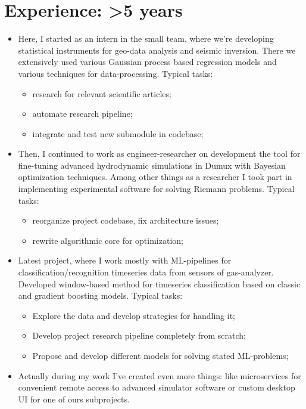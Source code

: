 \documentclass[12pt,a4paper,sans]{moderncv}
\begin{document}
\section{Experience: >5 years}
\begin{itemize}
\item Here, I started as an intern in the small team, where we're developing statistical instruments for geo-data analysis and seismic inversion. 
There we extensively used various Gaussian process based regression models and various techniques for data-processing. \newline \newline
Typical tasks: 
 \begin{itemize}
  \item research for relevant scientific articles;
  \item automate research pipeline;
  \item integrate and test new submodule in codebase; \newline
 \end{itemize}
\item Then, I continued to work as engineer-researcher on development the tool for fine-tuning advanced 
hydrodynamic simulations in Dumux with Bayesian optimization techniques.  
Among other things as a researcher I took part in implementing experimental software for solving Riemann problems. \newline \newline
Typical tasks: 
 \begin{itemize}
  \item reorganize project codebase, fix architecture issues;
  \item rewrite algorithmic core for optimization; \newline
 \end{itemize}
\item Latest project, where I work mostly with ML-pipelines for classification/recognition timeseries data from sensors of gas-analyzer.
Developed window-based method for timeseries classification based on classic and gradient boosting models.
\newline \newline
Typical tasks: 
 \begin{itemize}
  \item Explore the data and develop strategies for handling it;
  \item Develop project research pipeline completely from scratch;
  \item Propose and develop different models for solving stated ML-problems; \newline
 \end{itemize}
\item Actually during my work I've created even more things: like microservices for convenient remote access to advanced simulator software or custom desktop UI for one of ours subprojects. \newline
\end{itemize}
\end{document}
